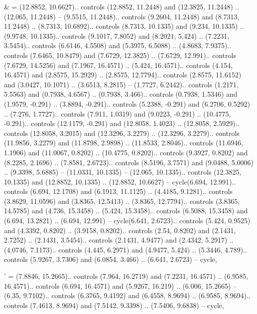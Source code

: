 & = {(12.8852, 10.6627).. controls (12.8852, 11.2448) and (12.3825, 11.2448) .. (12.065, 11.2448) -- (9.5515, 11.2448).. controls (9.2604, 11.2448) and (8.7313, 11.2448) .. (8.7313, 10.6892).. controls (8.7313, 10.1335) and (9.234, 10.1335) .. (9.9748, 10.1335).. controls (9.1017, 7.8052) and (8.2021, 5.424) .. (7.2231, 3.5454).. controls (6.6146, 4.5508) and (5.3975, 6.5088) .. (4.8683, 7.9375).. controls (7.6465, 10.8479) and (7.6729, 12.3825) .. (7.6729, 12.991).. controls (7.6729, 14.5256) and (7.1967, 16.4571) .. (5.424, 16.4571).. controls (4.154, 16.4571) and (2.8575, 15.2929) .. (2.8575, 12.7794).. controls (2.8575, 11.6152) and (3.0427, 10.1071) .. (3.6513, 8.2815) -- (1.7727, 6.2442).. controls (1.2171, 5.5563) and (0.7938, 4.6567) .. (0.7938, 3.466).. controls (0.7938, 1.5346) and (1.9579, -0.291) .. (3.8894, -0.291).. controls (5.2388, -0.291) and (6.2706, 0.5292) .. (7.276, 1.7727).. controls (7.911, 1.0319) and (9.0223, -0.291) .. (10.4775, -0.291).. controls (12.1179, -0.291) and (12.8058, 1.4023) .. (12.8058, 2.5929).. controls (12.8058, 3.2015) and (12.3296, 3.2279) .. (12.3296, 3.2279).. controls (11.9856, 3.2279) and (11.8798, 2.9898) .. (11.8533, 2.8046).. controls (11.6946, 1.1906) and (11.0067, 0.8202) .. (10.4775, 0.8202).. controls (9.3927, 0.8202) and (8.2285, 2.1696) .. (7.8581, 2.6723).. controls (8.5196, 3.7571) and (9.0488, 5.0006) .. (9.3398, 5.6885) -- (11.0331, 10.1335) -- (12.065, 10.1335).. controls (12.3825, 10.1335) and (12.8852, 10.1335) .. (12.8852, 10.6627) -- cycle(6.694, 12.991).. controls (6.694, 12.1708) and (6.1913, 11.1125) .. (4.4185, 9.1281).. controls (3.8629, 11.0596) and (3.8365, 12.5413) .. (3.8365, 12.7794).. controls (3.8365, 14.5785) and (4.736, 15.3458) .. (5.424, 15.3458).. controls (6.5088, 15.3458) and (6.694, 13.2821) .. (6.694, 12.991) -- cycle(6.641, 2.6723).. controls (5.424, 0.9525) and (4.3392, 0.8202) .. (3.9158, 0.8202).. controls (2.54, 0.8202) and (2.1431, 2.7252) .. (2.1431, 3.5454).. controls (2.1431, 4.9477) and (2.4342, 5.2917) .. (4.0746, 7.1173).. controls (4.445, 6.2971) and (4.9477, 5.424) .. (5.3446, 4.789).. controls (5.9267, 3.7306) and (6.0854, 3.466) .. (6.641, 2.6723) -- cycle},

' = {(7.8846, 15.2665).. controls (7.964, 16.2719) and (7.2231, 16.4571) .. (6.9585, 16.4571).. controls (6.694, 16.4571) and (5.9267, 16.219) .. (6.006, 15.2665) -- (6.35, 9.7102).. controls (6.3765, 9.4192) and (6.4558, 8.9694) .. (6.9585, 8.9694).. controls (7.4613, 8.9694) and (7.5142, 9.3398) .. (7.5406, 9.6838) -- cycle},

